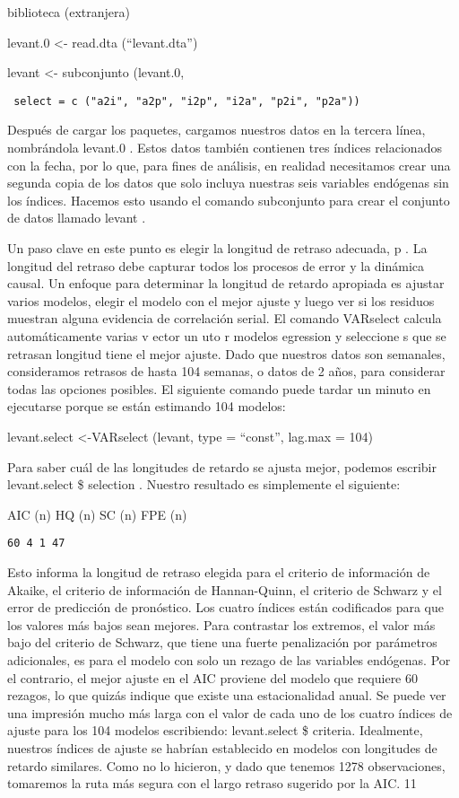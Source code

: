 \documentclass[
]{book}
\begin{document}
biblioteca (extranjera)

levant.0 \textless- read.dta (``levant.dta'')

levant \textless- subconjunto (levant.0,

\begin{verbatim}
 select = c ("a2i", "a2p", "i2p", "i2a", "p2i", "p2a"))
\end{verbatim}

Después de cargar los paquetes, cargamos nuestros datos en la tercera línea, nombrándola levant.0 . Estos datos también contienen tres índices relacionados con la fecha, por lo que, para fines de análisis, en realidad necesitamos crear una segunda copia de los datos que solo incluya nuestras seis variables endógenas sin los índices. Hacemos esto usando el comando subconjunto para crear el conjunto de datos llamado levant .

Un paso clave en este punto es elegir la longitud de retraso adecuada, p . La longitud del retraso debe capturar todos los procesos de error y la dinámica causal. Un enfoque para determinar la longitud de retardo apropiada es ajustar varios modelos, elegir el modelo con el mejor ajuste y luego ver si los residuos muestran alguna evidencia de correlación serial. El comando VARselect calcula automáticamente varias v ector un uto r modelos egression y seleccione s que se retrasan longitud tiene el mejor ajuste. Dado que nuestros datos son semanales, consideramos retrasos de hasta 104 semanas, o datos de 2 años, para considerar todas las opciones posibles. El siguiente comando puede tardar un minuto en ejecutarse porque se están estimando 104 modelos:

levant.select \textless-VARselect (levant, type = ``const'', lag.max = 104)

Para saber cuál de las longitudes de retardo se ajusta mejor, podemos escribir levant.select \$ selection . Nuestro resultado es simplemente el siguiente:

AIC (n) HQ (n) SC (n) FPE (n)

\begin{verbatim}
60 4 1 47
\end{verbatim}

Esto informa la longitud de retraso elegida para el criterio de información de Akaike, el criterio de información de Hannan-Quinn, el criterio de Schwarz y el error de predicción de pronóstico. Los cuatro índices están codificados para que los valores más bajos sean mejores. Para contrastar los extremos, el valor más bajo del criterio de Schwarz, que tiene una fuerte penalización por parámetros adicionales, es para el modelo con solo un rezago de las variables endógenas. Por el contrario, el mejor ajuste en el AIC proviene del modelo que requiere 60 rezagos, lo que quizás indique que existe una estacionalidad anual. Se puede ver una impresión mucho más larga con el valor de cada uno de los cuatro índices de ajuste para los 104 modelos escribiendo: levant.select \$ criteria. Idealmente, nuestros índices de ajuste se habrían establecido en modelos con longitudes de retardo similares. Como no lo hicieron, y dado que tenemos 1278 observaciones, tomaremos la ruta más segura con el largo retraso sugerido por la AIC. 11
\end{document}
